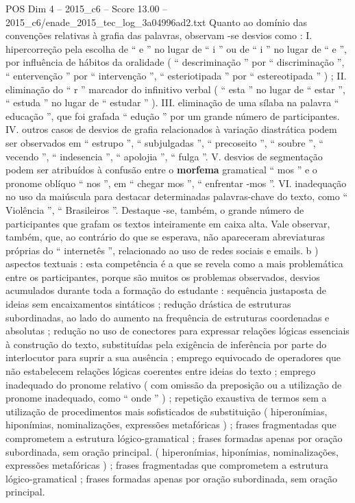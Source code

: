 \begin{textsample}{POS Dim 4 – 2015\_c6 – Score 13.00 – 2015\_c6/enade\_2015\_tec\_log\_3a04996ad2.txt}
Quanto ao domínio das convenções relativas à grafia das palavras, observam -se desvios como : I. hipercorreção pela escolha de “ e ” no lugar de “ i ” ou de “ i ” no lugar de “ e ”, por influência de hábitos da oralidade ( “ descriminação ” por “ discriminação ”, “ entervenção ” por “ intervenção ”, “ esteriotipada ” por “ estereotipada ” ) ; II. eliminação do “ r ” marcador do infinitivo verbal ( “ esta ” no lugar de “ estar ”, “ estuda ” no lugar de “ estudar ” ).
III. eliminação de uma sílaba na palavra “ educação ”, que foi grafada “ edução ” por um grande número de participantes.
IV. outros casos de desvios de grafia relacionados à variação diastrática podem ser observados em “ estrupo ”, “ subjulgadas ”, “ precoseito ”, “ soubre ”, “ vecendo ”, “ indesencia ”, “ apolojia ”, “ fulga ”.
V. desvios de segmentação podem ser atribuídos à confusão entre o \textbf{morfema} gramatical “ mos ” e o pronome oblíquo “ nos ”, em “ chegar mos ”, “ enfrentar -mos ”.
VI. inadequação no uso da maiúscula para destacar determinadas palavras-chave do texto, como “ Violência ”, “ Brasileiros ”.
Destaque -se, também, o grande número de participantes que grafam os textos inteiramente em caixa alta.
Vale observar, também, que, ao contrário do que se esperava, não apareceram abreviaturas próprias do “ internetês ”, relacionado ao uso de redes sociais e emails. b ) aspectos textuais : esta competência é a que se revela como a mais problemática entre os participantes, porque são muitos os problemas observados, desvios acumulados durante toda a formação do estudante : sequência justaposta de ideias sem encaixamentos sintáticos ; redução drástica de estruturas subordinadas, ao lado do aumento na frequência de estruturas coordenadas e absolutas ; redução no uso de conectores para expressar relações lógicas essenciais à construção do texto, substituídas pela exigência de inferência por parte do interlocutor para suprir a sua ausência ; emprego equivocado de operadores que não estabelecem relações lógicas coerentes entre ideias do texto ; emprego inadequado do pronome relativo ( com omissão da preposição ou a utilização de pronome inadequado, como “ onde ” ) ; repetição exaustiva de termos sem a utilização de procedimentos mais sofisticados de substituição ( hiperonímias, hiponímias, nominalizações, expressões metafóricas ) ; frases fragmentadas que comprometem a estrutura lógico-gramatical ; frases formadas apenas por oração subordinada, sem oração principal. ( hiperonímias, hiponímias, nominalizações, expressões metafóricas ) ; frases fragmentadas que comprometem a estrutura lógico-gramatical ; frases formadas apenas por oração subordinada, sem oração principal.

\end{textsample}
